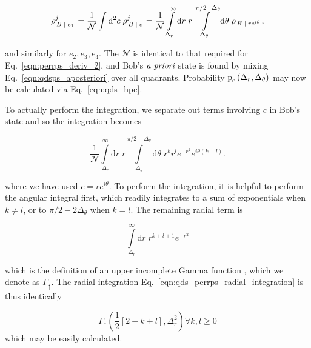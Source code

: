 \begin{align}\label{eqn:qdsps_aposteriori}
\rho_{\left.B \given e_1\right.}^j = \frac{1}{\mathcal{N}} \int \Diff2 c \; \rho_{\left. B \given c\right.}^j
%
=\frac{1}{\mathcal{N}} \int\limits_{\Delta_r}^\infty \mathrm{d}r\; r\int\limits_{\Delta_\theta}^{\pi/2 - \Delta_\theta} \mathrm{d}\theta \; \rho_{\left. B \given r e^{i \theta}\right.},
\end{align}

\noindent and similarly for $e_2, e_3, e_4$. The $\mathcal{N}$ is identical to that required for Eq.~\ref{eqn:perrps_deriv_2}, and Bob's $\emph{a priori}$ state is found by mixing Eq.~\ref{eqn:qdsps_aposteriori} over all quadrants. Probability $\text{p}_{\text{e}}\left(\Delta_r, \Delta_\theta\right)$ may now be calculated via Eq.~\ref{eqn:qds_hpe}. 

To actually perform the integration, we separate out terms involving $c$ in Bob's state %
and so the integration becomes

\begin{equation}
\frac{1}{\mathcal{N}} \int\limits_{\Delta_r}^{\infty} \mathrm{d}r \; r \int\limits_{\Delta_\theta}^{\pi/2 - \Delta_\theta} \mathrm{d}\theta \; r^k r^l e^{-r^2} e^{i \theta \left(k - l\right)}.
\end{equation}

\noindent where we have used $c = r e^{i \theta}$. To perform the integration, it is helpful to perform the angular integral first, which readily integrates to a sum of exponentials when $k \ne l$, or to $\pi/2 - 2\Delta_\theta$ when $k=l$. The remaining radial term is

\begin{equation}\label{eqn:qds_perrps_radial_integration}
\int\limits_{\Delta_r}^\infty \mathrm{d}r \; r^{k + l + 1} e^{-r^2}
\end{equation}

\noindent which is the definition of an upper incomplete Gamma function \cite{Mathworld_Incomplete_Gamma}, which we denote as $\Gamma_\uparrow$. The radial integration Eq.~\ref{eqn:qds_perrps_radial_integration} is thus identically

\begin{equation}
\Gamma_{\uparrow}\left(\frac{1}{2}\left[2 + k + l\right], \Delta_r^2\right)  \forall k, l \ge 0
\end{equation}
which may be easily calculated.

